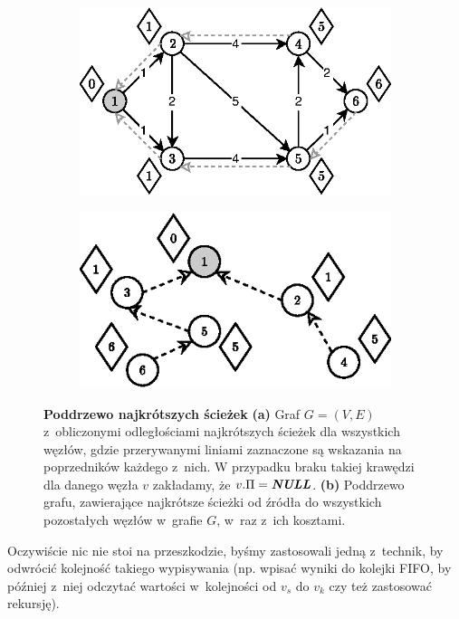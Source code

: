 \begin{figure}[!htbp]
	\centering
	\begin{subfigure}[b]{0.45\textwidth}
		\includegraphics[width=\textwidth]{Chapter_I/10/1_10a.eps}
		\caption{}
	\end{subfigure}%
	\qquad
	\begin{subfigure}[b]{0.45\textwidth}
		\includegraphics[width=\textwidth]{Chapter_I/10/1_10b.eps}
		\caption{}
	\end{subfigure}
	\caption{\textbf{Poddrzewo najkrótszych ścieżek} \textbf{(a)} Graf $G = \left( V, E \right)$ z~obliczonymi odległościami najkrótszych ścieżek dla wszystkich węzłów, gdzie przerywanymi liniami zaznaczone są wskazania na poprzedników każdego z~nich. W przypadku braku takiej krawędzi dla danego węzła $v$ zakładamy, że $v.\Pi = \emph{\textbf{NULL}}$. \textbf{(b)} Poddrzewo grafu, zawierające najkrótsze ścieżki od źródła do wszystkich pozostałych węzłów w~grafie $G$, w~raz z~ich kosztami.}\label{fig:shortestPathTree}
\end{figure}

Oczywiście nic nie stoi na przeszkodzie, byśmy zastosowali jedną z~technik, by odwrócić kolejność takiego wypisywania (np. wpisać wyniki do kolejki FIFO, by później z~niej odczytać wartości w~kolejności od $v_{s}$ do $v_{k}$ czy też zastosować rekursję).

